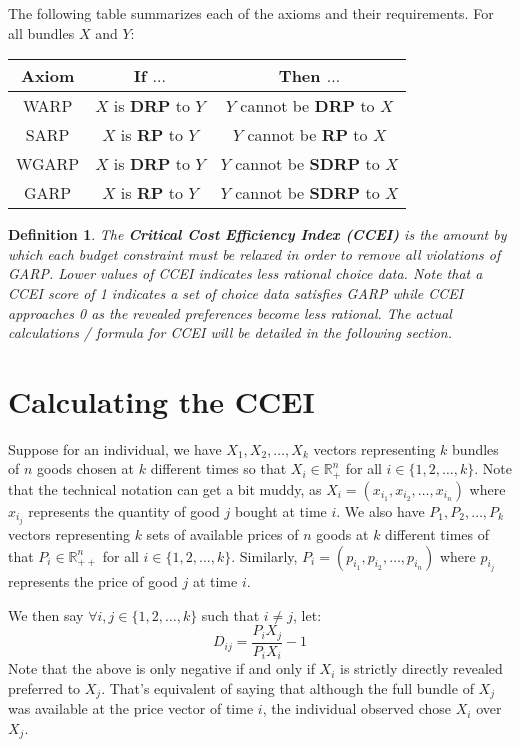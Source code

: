 \documentclass{article} %
\newtheorem{definition}{Definition} %
\begin{document}
The following table summarizes each of the axioms and their requirements. For all bundles $X$ and $Y$:

\renewcommand{\arraystretch}{1.5}
\begin{center}
\begin{tabular}{ c|c|c } 
Axiom & If $\ldots$ & Then $\ldots$ \\\hline
WARP&$X$ is \textbf{DRP} to $Y$&$Y$ cannot be \textbf{DRP} to $X$ \\
SARP&$X$ is \textbf{RP} to $Y$&$Y$ cannot be \textbf{RP} to $X$ \\
WGARP&$X$ is \textbf{DRP} to $Y$&$Y$ cannot be \textbf{SDRP} to $X$ \\
GARP&$X$ is \textbf{RP} to $Y$&$Y$ cannot be \textbf{SDRP} to $X$
\end{tabular}
\end{center}
\renewcommand{\arraystretch}{1}

\begin{definition}
The \textbf{Critical Cost Efficiency Index (CCEI)} is the amount by which each budget
constraint must be relaxed in order to remove all violations of GARP. Lower values of CCEI indicates less rational choice data. Note that a CCEI score of 1 indicates a set of choice data satisfies GARP while CCEI approaches 0 as the revealed preferences become less rational. The actual calculations / formula for CCEI will be detailed in the following section.
\end{definition}

\section{Calculating the CCEI}
Suppose for an individual, we have $X_{1}, X_{2}, \ldots, X_{k}$ vectors representing $k$ bundles of $n$ goods chosen at $k$ different times so that $X_{i}\in\mathbb{R}^{n}_{+}$ for all $i\in\{1,2,\ldots,k\}$. Note that the technical notation can get a bit muddy, as $X_{i}=(x_{i_{1}}, x_{i_{2}}, \ldots, x_{i_{n}})$ where $x_{i_{j}}$ represents the quantity of good $j$ bought at time $i$. We also have $P_{1}, P_{2}, \dots, P_{k}$ vectors representing $k$ sets of available prices of $n$ goods at $k$ different times of that $P_{i}\in\mathbb{R}^{n}_{++}$ for all $i\in\{1,2,\ldots,k\}$. Similarly, $P_{i}=(p_{i_{1}}, p_{i_{2}}, \ldots, p_{i_{n}})$ where $p_{i_{j}}$ represents the price of good $j$ at time $i$.
\bigskip

We then say $\forall i,j\in\{1,2,\ldots,k\}$ such that $i\not=j$, let:
    $$D_{ij}=\frac{P_{i}X_{j}}{P_{i}X_{i}}-1$$
Note that the above is only negative if and only if $X_{i}$ is strictly directly revealed preferred to $X_{j}$. That's equivalent of saying that although the full bundle of $X_{j}$ was available at the price vector of time $i$, the individual observed chose $X_{i}$ over $X_{j}$.
\bigskip
\end{document}
